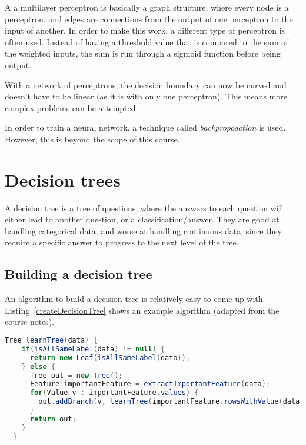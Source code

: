 A a multilayer perceptron is basically a graph structure, where every node is a
perceptron, and edges are connections from the output of one perceptron to the
input of another. In order to make this work, a different type of perceptron is
often used. Instead of having a threshold value that is compared to the sum of
the weighted inputs, the sum is run through a sigmoid function before being
output.

With a network of perceptrons, the decision boundary can now be curved and
doesn't have to be linear (as it is with only one perceptron). This means more
complex problems can be attempted.

In order to train a neural network, a technique called \textit{backpropogation}
is used. However, this is beyond the scope of this course.


\section{Decision trees}


A decision tree is a tree of questions, where the answers to each question will
either lead to another question, or a classification/answer. They are good at
handling categorical data, and worse at handling continuous data, since they
require a specific answer to progress to the next level of the tree.

\subsection{Building a decision tree}

An algorithm to build a decision tree is relatively easy to come up with.
Listing~\ref{createDecisionTree} shows an example algorithm (adapted from the
course notes).

\begin{lstlisting}[language=java, label=createDecisionTree,
                   caption=An algorithm (the ID3 algorithm) to produce a
                  decision tree in Java]
  Tree learnTree(data) {
    if(isAllSameLabel(data) != null) {
      return new Leaf(isAllSameLabel(data));
    } else {
      Tree out = new Tree();
      Feature importantFeature = extractImportantFeature(data);
      for(Value v : importantFeature.values) {
        out.addBranch(v, learnTree(importantFeature.rowsWithValue(data, v)));
      }
      return out;
    }
  }
\end{lstlisting}

